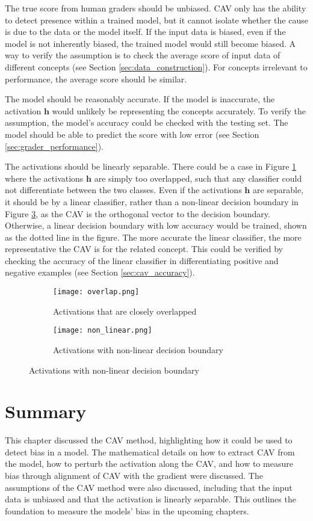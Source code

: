 The true score from human graders should be unbiased. CAV only has the ability to detect presence within a trained model, but it cannot isolate whether the cause is due to the data or the model itself. If the input data is biased, even if the model is not inherently biased, the trained model would still become biased. A way to verify the assumption is to check the average score of input data of different concepts (see Section \ref{sec:data_construction}). For concepts irrelevant to performance, the average score should be similar.

The model should be reasonably accurate. If the model is inaccurate, the activation $\boldsymbol{h}$ would unlikely be representing the concepts accurately. To verify the assumption, the model's accuracy could be checked with the testing set. The model should be able to predict the score with low error (see Section \ref{sec:grader_performance}).

The activations should be linearly separable. There could be a case in Figure \ref{fig:overlap} where the activations $\boldsymbol{h}$ are simply too overlapped, such that any classifier could not differentiate between the two classes. Even if the activations $\boldsymbol{h}$ are separable, it should be by a linear classifier, rather than a non-linear decision boundary in Figure \ref{fig:non_linear}, as the CAV is the orthogonal vector to the decision boundary. Otherwise, a linear decision boundary with low accuracy would be trained, shown as the dotted line in the figure. The more accurate the linear classifier, the more representative the CAV is for the related concept. This could be verified by checking the accuracy of the linear classifier in differentiating positive and negative examples (see Section \ref{sec:cav_accuracy}).


\begin{figure}[H]
    \centering
    \begin{subfigure}{0.48\textwidth}
        \centering
        \texttt{[image: overlap.png]}
        \caption{Activations that are closely overlapped}
        \label{fig:overlap}
    \end{subfigure}
    \hfill
    \begin{subfigure}{0.48\textwidth}
        \centering
        \texttt{[image: non\_linear.png]}
        \caption{Activations with non-linear decision boundary}
        \label{fig:non_linear}
    \end{subfigure}
\end{figure}

\section{Summary}
This chapter discussed the CAV method, highlighting how it could be used to detect bias in a model. The mathematical details on how to extract CAV from the model, how to perturb the activation along the CAV, and how to measure bias through alignment of CAV with the gradient were discussed. The assumptions of the CAV method were also discussed, including that the input data is unbiased and that the activation is linearly separable. This outlines the foundation to measure the models' bias in the upcoming chapters.